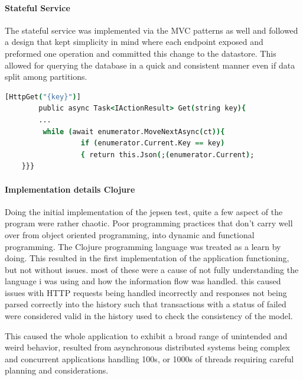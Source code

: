 \documentclass[a4paper,10pt,titlepage]{report}
\begin{document}
\paragraph*{Stateful Service}

The stateful service was implemented via the MVC patterns as well and followed a design that kept simplicity in mind where each endpoint exposed and preformed one operation and committed this change to the datastore. This allowed for querying the database in a quick and consistent manner even if data split among  partitions.
\begin{lstlisting}[language=csh]
        [HttpGet("{key}")]
        public async Task<IActionResult> Get(string key){
        ...
         while (await enumerator.MoveNextAsync(ct)){
                  if (enumerator.Current.Key == key)
                  { return this.Json(;(enumerator.Current);
    }}}
\end{lstlisting}   

\paragraph*{Implementation details Clojure}
 
 Doing the initial implementation of the jepsen test, quite a few aspect of the program were rather chaotic. Poor programming practices that don't carry well over from object oriented  programming, into dynamic and functional programming. The Clojure programming language was treated as a learn by doing. This resulted in the first implementation of the application functioning, but not without issues. most of these were a cause of not fully understanding the language i was using and how the information flow was handled. this caused issues with HTTP requests being handled incorrectly and responses not being parsed correctly into the history such that transactions with a status of failed were considered valid in the history used to check the consistency of the model.
 
 This caused the whole application to exhibit a broad range of unintended and weird behavior, resulted from asynchronous distributed systems being complex and concurrent applications handling 100s, or 1000s of threads requiring careful planning and considerations.
        
\end{document}
